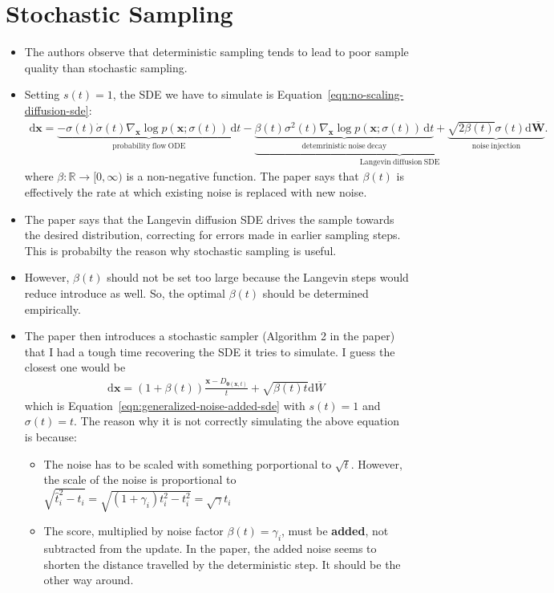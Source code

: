 \documentclass[10pt]{article}
\newcommand{\dee}{\mathrm{d}}
\newcommand{\ve}[1]{\mathbf{#1}}
\newcommand{\ves}[1]{\boldsymbol{#1}}
\newcommand{\Real}{\mathbb{R}}
\begin{document}
\section{Stochastic Sampling}

\begin{itemize}
  \item The authors observe that deterministic sampling tends to lead to poor sample quality than stochastic sampling.
  
  \item Setting $s(t) = 1$, the SDE we have to simulate is Equation~\eqref{eqn:no-scaling-diffusion-sde}:
  \begin{align*}
    \dee\ve{x}
    =
    \underbrace{-\sigma(t)\dot{\sigma}(t) \nabla_{\ve{x}} \log p(\ve{x};\sigma(t))\, \dee t}_{\mathrm{probability\ flow\ ODE}}
    -
    \underbrace{
      \underbrace{\beta(t)\sigma^2(t) \nabla_{\ve{x}} \log p(\ve{x};\sigma(t))\, \dee t}_{\mathrm{detemrinistic\ noise\ decay}} 
      + \underbrace{\sqrt{2\beta(t)}\sigma(t) \dee \overline{\ve{W}}}_{\mathrm{noise\ injection}}
    }_{\mathrm{Langevin\ diffusion\ SDE}}
    .
  \end{align*}
  where $\beta: \Real \rightarrow [0,\infty)$ is a non-negative function. The paper says that $\beta(t)$ is effectively the rate at which existing noise is replaced with new noise.

  \item The paper says that the Langevin diffusion SDE drives the sample towards the desired distribution, correcting for errors made in earlier sampling steps. This is probabilty the reason why stochastic sampling is useful.
  
  \item However, $\beta(t)$ should not be set too large because the Langevin steps would reduce introduce as well. So, the optimal $\beta(t)$ should be determined empirically.
  
  \item The paper then introduces a stochastic sampler (Algorithm 2 in the paper) that I had a tough time recovering the SDE it tries to simulate. I guess the closest one would be
  \begin{align*}
    \dee\ve{x} = (1 + \beta(t))\frac{\ve{x} - D_{\ves{\theta}(\ve{x},t)}}{t} + \sqrt{\beta(t) t} \dee \overline{W}\, 
  \end{align*}
  which is Equation~\eqref{eqn:generalized-noise-added-sde} with $s(t) = 1$ and $\sigma(t) = t$. The reason why it is not correctly simulating the above equation is because:
  \begin{itemize}
    \item The noise has to be scaled with something porportional to $\sqrt{t}$. However, the scale of the noise is proportional to $\sqrt{\hat{t}_i^2 - t_i} = \sqrt{(1 + \gamma_i)t_i^2 - t_i^2} = \sqrt{\gamma} t_i$
    \item The score, multiplied by noise factor $\beta(t) = \gamma_i$, must be {\bf added}, not subtracted from the update. In the paper, the added noise seems to shorten the distance travelled by the deterministic step. It should be the other way around.
  \end{itemize}


\end{itemize}
\end{document}
